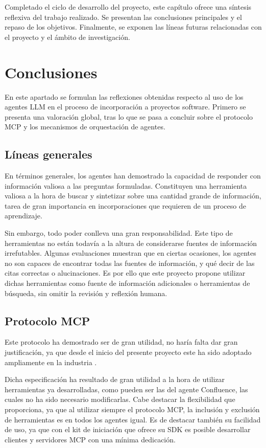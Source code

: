 Completado el ciclo de desarrollo del proyecto, este capítulo ofrece una síntesis reflexiva del trabajo realizado. Se presentan las conclusiones principales y el repaso de los objetivos. Finalmente, se exponen las líneas futuras relacionadas con el proyecto y el ámbito de investigación.

\section{Conclusiones}
En este apartado se formulan las reflexiones obtenidas respecto al uso de los agentes LLM en el proceso de incorporación a proyectos software. Primero se presenta una valoración global, tras lo que se pasa a concluir sobre el protocolo MCP y los mecanismos de orquestación de agentes. 

\subsection{Líneas generales}
En términos generales, los agentes han demostrado la capacidad de responder con información valiosa a las preguntas formuladas. Constituyen una herramienta valiosa a la hora de buscar y sintetizar sobre una cantidad grande de información, tarea de gran importancia en incorporaciones que requieren de un proceso de aprendizaje. 

Sin embargo, todo poder conlleva una gran responsabilidad. Este tipo de herramientas no están todavía a la altura de considerarse fuentes de información irrefutables. Algunas evaluaciones muestran que en ciertas ocasiones, los agentes no son capaces de encontrar todas las fuentes de información, y qué decir de las citas correctas o alucinaciones. Es por ello que este proyecto propone utilizar dichas herramientas como fuente de información adicionales o herramientas de búsqueda, sin omitir la revisión y reflexión humana.

\subsection{Protocolo MCP}
Este protocolo ha demostrado ser de gran utilidad, no haría falta dar gran justificación, ya que desde el inicio del presente proyecto este ha sido adoptado ampliamente en la industria \cite{}.  

Dicha especificación ha resultado de gran utilidad a la hora de utilizar herramientas ya desarrolladas, como pueden ser las del agente Confluence, las cuales no ha sido necesario modificarlas. Cabe destacar la flexibilidad que proporciona, ya que al utilizar siempre el protocolo MCP, la inclusión y exclusión de herramientas es en todos los agentes igual. Es de destacar también su facilidad de uso, ya que con el kit de iniciación que ofrece su SDK es posible desarrollar clientes y servidores MCP con una mínima dedicación.

